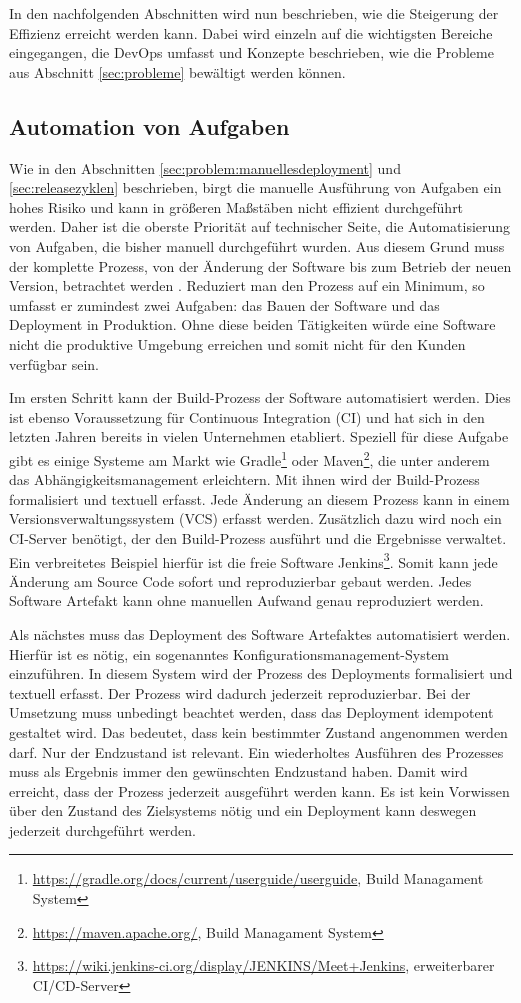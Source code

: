 In den nachfolgenden Abschnitten wird nun beschrieben, wie die Steigerung der Effizienz erreicht werden kann. Dabei wird einzeln auf die wichtigsten Bereiche eingegangen, die DevOps umfasst und Konzepte beschrieben, wie die Probleme aus Abschnitt \ref{sec:probleme} bewältigt werden können.

\subsection{Automation von Aufgaben}
\label{sec:automation:aufgaben}
Wie in den Abschnitten \ref{sec:problem:manuellesdeployment} und  \ref{sec:releasezyklen} beschrieben, birgt die manuelle Ausführung von Aufgaben ein hohes Risiko und kann in größeren Maßstäben nicht effizient durchgeführt werden. Daher ist die oberste Priorität auf technischer Seite, die Automatisierung von Aufgaben, die bisher manuell durchgeführt wurden. Aus diesem Grund muss der komplette Prozess, von der Änderung der Software bis zum Betrieb der neuen Version, betrachtet werden \cite{wolff2014}. Reduziert man den Prozess auf ein Minimum, so umfasst er zumindest zwei Aufgaben: das Bauen der Software und das Deployment in Produktion. Ohne diese beiden Tätigkeiten würde eine Software nicht die produktive Umgebung erreichen und somit nicht für den Kunden verfügbar sein.

Im ersten Schritt kann der Build-Prozess der Software automatisiert werden. Dies ist ebenso Voraussetzung für Continuous Integration (CI) und hat sich in den letzten Jahren bereits in vielen Unternehmen etabliert. Speziell für diese Aufgabe gibt es einige Systeme am Markt wie Gradle\footnote{\url{https://gradle.org/docs/current/userguide/userguide}, Build Managament System} oder Maven\footnote{\url{https://maven.apache.org/}, Build Managament System}, die unter anderem das Abhängigkeitsmanagement erleichtern. Mit ihnen wird der Build-Prozess formalisiert und textuell erfasst. Jede Änderung an diesem Prozess kann in einem Versionsverwaltungssystem (VCS) erfasst werden. Zusätzlich dazu wird noch ein CI-Server benötigt, der den Build-Prozess ausführt und die Ergebnisse verwaltet. Ein verbreitetes Beispiel hierfür ist die freie Software Jenkins\footnote{\url{https://wiki.jenkins-ci.org/display/JENKINS/Meet+Jenkins}, erweiterbarer CI/CD-Server}. Somit kann jede Änderung am Source Code sofort und reproduzierbar gebaut werden. Jedes Software Artefakt kann ohne manuellen Aufwand genau reproduziert werden.

Als nächstes muss das Deployment des Software Artefaktes automatisiert werden. Hierfür ist es nötig, ein sogenanntes Konfigurationsmanagement-System einzuführen. In diesem System wird der Prozess des Deployments formalisiert und textuell erfasst. Der Prozess wird dadurch jederzeit reproduzierbar. Bei der Umsetzung muss unbedingt beachtet werden, dass das Deployment idempotent gestaltet wird. Das bedeutet, dass kein bestimmter Zustand angenommen werden darf. Nur der Endzustand ist relevant. Ein wiederholtes Ausführen des Prozesses muss als Ergebnis immer den gewünschten Endzustand haben. Damit wird erreicht, dass der Prozess jederzeit ausgeführt werden kann. Es ist kein Vorwissen über den Zustand des Zielsystems nötig und ein Deployment kann deswegen jederzeit durchgeführt werden.

